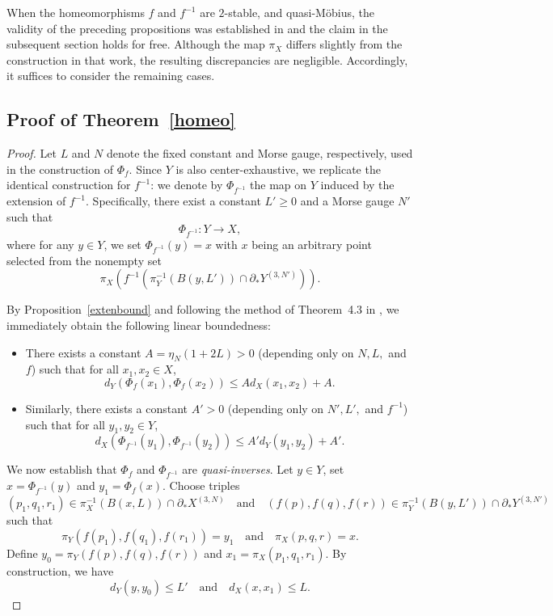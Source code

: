 \documentclass[a4paper,11pt,oneside]{article}
\begin{document}
    When the homeomorphisms $f$ and $f^{-1}$ are $2$-stable, and quasi-M\"obius, the validity of the preceding propositions was established in \cite{CharneyCordesMurray19} and the claim in the subsequent section holds for free. Although the map $\pi_X$ differs slightly from the construction in that work, the resulting discrepancies are negligible. Accordingly, it suffices to consider the remaining cases.

\subsection{Proof of Theorem~\ref{homeo}}

\begin{proof}
Let $L$ and $N$ denote the fixed constant and Morse gauge, respectively, used in the construction of $\Phi_f$.
Since $Y$ is also center-exhaustive, we replicate the identical construction for $f^{-1}$: we denote by $\Phi_{f^{-1}}$ the map on $Y$ induced by the extension of $f^{-1}$. 
Specifically, there exist a constant $L'\ge0$ and a Morse gauge $N'$ such that 
\[
\Phi_{f^{-1}}:Y\to X,
\]
where for any $y\in Y$, we set $\Phi_{f^{-1}}(y)=x$ with $x$ being an arbitrary point selected from the nonempty set
\[
\pi_X(f^{-1}(\pi_{Y}^{-1}(B(y, L'))\cap \partial_*Y^{(3, N')})).
\]

By Proposition~\ref{extenbound} and following the method of Theorem~4.3 in \cite{Liu22}, we immediately obtain the following linear boundedness: 
\begin{itemize}
    \item There exists a constant $A=\eta_{N}(1+2L)>0$ (depending only on $N, L,$ and $f$) such that for all $x_1, x_2\in X$,
    \[
    d_Y(\Phi_f(x_1), \Phi_f(x_2))\le A d_X(x_1, x_2)+A.
    \]
    \item Similarly, there exists a constant $A'>0$ (depending only on $N', L',$ and $f^{-1}$) such that for all $y_1, y_2\in Y$,
    \[
    d_X(\Phi_{f^{-1}}(y_1), \Phi_{f^{-1}}(y_2))\le A' d_Y(y_1, y_2)+A'.
    \]
\end{itemize}

We now establish that $\Phi_f$ and $\Phi_{f^{-1}}$ are \textit{quasi-inverses}. 
Let $y\in Y$, set $x=\Phi_{f^{-1}}(y)$ and $y_1=\Phi_{f}(x)$. Choose triples 
\[
(p_1, q_1, r_1)\in \pi_X^{-1}(B(x, L))\cap \partial_*X^{(3, N)} \quad \text{and} \quad (f(p), f(q), f(r))\in \pi_Y^{-1}(B(y, L'))\cap \partial_*Y^{(3, N')}
\]
such that
\[
\pi_Y(f(p_1),f(q_1), f(r_1) )=y_1\quad\text{and}\quad\pi_X(p, q, r)=x.
\]
Define $y_0=\pi_Y(f(p), f(q), f(r))$ and $x_1=\pi_X(p_1, q_1, r_1)$.
By construction, we have 
\[
d_Y(y, y_0)\le L' \quad \text{and} \quad d_X(x,x_1)\le L.
\]


\end{proof}
\end{document}
